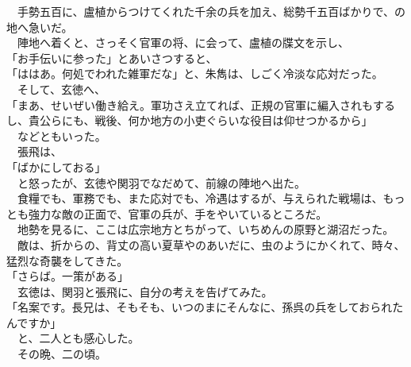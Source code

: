 \documentclass[
  paper=a5,
  fontsize=10pt,
  jafontsize=9.5pt,
  tate,                  %
  open_bracket_pos=nibu, %
]{jlreq}
\begin{document}
　手勢五百に、盧植からつけてくれた千余の兵を加え、総勢千五百ばかりで、の地へ急いだ。\\


　陣地へ着くと、さっそく官軍の将、に会って、盧植の牒文を示し、\\


「お手伝いに参った」とあいさつすると、\\


「ははあ。何処でわれた雑軍だな」と、朱雋は、しごく冷淡な応対だった。\\


　そして、玄徳へ、\\


「まあ、せいぜい働き給え。軍功さえ立てれば、正規の官軍に編入されもするし、貴公らにも、戦後、何か地方の小吏ぐらいな役目は仰せつかるから」\\


　などともいった。\\


　張飛は、\\


「ばかにしておる」\\


　と怒ったが、玄徳や関羽でなだめて、前線の陣地へ出た。\\


　食糧でも、軍務でも、また応対でも、冷遇はするが、与えられた戦場は、もっとも強力な敵の正面で、官軍の兵が、手をやいているところだ。\\


　地勢を見るに、ここは広宗地方とちがって、いちめんの原野と湖沼だった。\\


　敵は、折からの、背丈の高い夏草やのあいだに、虫のようにかくれて、時々、猛烈な奇襲をしてきた。\\


「さらば。一策がある」\\


　玄徳は、関羽と張飛に、自分の考えを告げてみた。\\


「名案です。長兄は、そもそも、いつのまにそんなに、孫呉の兵をしておられたんですか」\\


　と、二人とも感心した。\\


　その晩、二の頃。\\
\end{document}
